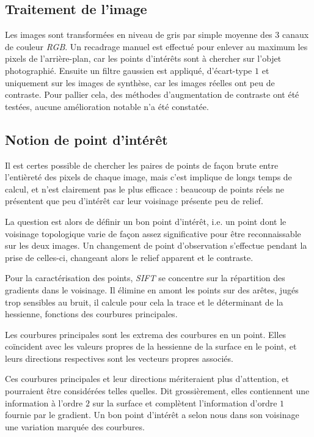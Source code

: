 \documentclass[
	a4paper, %
	10pt, %
	unnumberedsections, %
	twoside, %
]{LTJournalArticle}
\begin{document}
\subsection{Traitement de l'image}
Les images sont transformées en niveau de gris par simple moyenne des $3$ canaux de couleur \textit{RGB}.
Un recadrage manuel est effectué pour enlever au maximum les pixels de l'arrière-plan, car les points
d'intérêts sont à chercher sur l'objet photographié. Ensuite un filtre gaussien est
appliqué, d'écart-type $1$ et uniquement sur les images de synthèse, car les images réelles
ont peu de contraste. Pour pallier cela, des méthodes d'augmentation
de contraste ont été testées, aucune amélioration notable n'a été constatée.


\subsection{Notion de point d'intérêt}

Il est certes possible de chercher les paires de points de façon brute entre
l'entièreté des pixels de chaque image, mais c'est implique de longs temps de calcul,
et n'est clairement pas le plus efficace : beaucoup de
points réels ne présentent que peu d'intérêt car leur voisinage présente
peu de relief.

La question est alors de définir un bon point
d'intérêt, i.e. un point dont le voisinage topologique varie de façon
assez significative pour être reconnaissable sur les deux images.
Un changement de point d'observation s'effectue pendant
la prise de celles-ci, changeant alors le relief apparent et le contraste.

Pour la caractérisation des points, \textit{SIFT} se concentre sur la répartition des gradients
dans le voisinage. Il élimine en amont les points sur des arêtes, jugés trop
sensibles au bruit, il calcule pour cela la trace et le déterminant
de la hessienne, fonctions des courbures principales.

Les courbures principales sont les extrema des courbures en un point.
Elles coïncident avec les valeurs propres de la hessienne de la surface en le point,
et leurs directions respectives sont les vecteurs propres associés.

Ces courbures principales et leur directions mériteraient plus d'attention,
et pourraient être considérées telles quelles. Dit grossièrement,
elles contiennent une information à l'ordre $2$ sur la surface et complètent
l'information d'ordre $1$ fournie par le gradient. Un bon
point d'intérêt a selon nous dans son voisinage une variation marquée des courbures.
\end{document}
